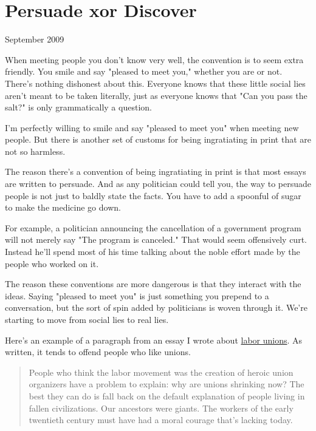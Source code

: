 \chapter{Persuade xor Discover}


            
              
                

September 2009

When meeting people you don't know
                  very well, the convention is to seem extra friendly. You smile
                  and say "pleased to meet you," whether you are or not. There's
                  nothing dishonest about this. Everyone knows that these little
                  social lies aren't meant to be taken literally, just as
                  everyone knows that "Can you pass the salt?" is only
                  grammatically a question.

I'm perfectly willing to
                  smile and say "pleased to meet you" when meeting new people.
                  But there is another set of customs for being ingratiating in
                  print that are not so harmless.

The reason there's
                  a convention of being ingratiating in print is that most
                  essays are written to persuade. And as any politician could
                  tell you, the way to persuade people is not just to baldly
                  state the facts. You have to add a spoonful of sugar to make
                  the medicine go down.

For example, a politician
                  announcing the cancellation of a government program will not
                  merely say "The program is canceled." That would seem
                  offensively curt. Instead he'll spend most of his time talking
                  about the noble effort made by the people who worked on it.

The
                  reason these conventions are more dangerous is that they
                  interact with the ideas. Saying "pleased to meet you" is just
                  something you prepend to a conversation, but the sort of spin
                  added by politicians is woven through it. We're starting to
                  move from social lies to real lies.

Here's an
                  example of a paragraph from an essay I wrote about
                  \href{http://www.paulgraham.com/unions.html}{labor unions}. As written, it tends
                  to offend people who like unions.
                  \begin{quote}

                    People who think the labor movement was the creation of
                    heroic union organizers have a problem to explain: why are
                    unions shrinking now? The best they can do is fall back on
                    the default explanation of people living in fallen
                    civilizations. Our ancestors were giants. The workers of the
                    early twentieth century must have had a moral courage that's
                    lacking today.
                  
\end{quote}

